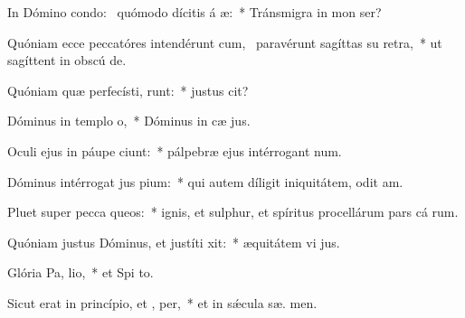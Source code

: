 \item In Dómino condo:~\pscross{} quómodo dícitis á æ:~* Tránsmigra in mon  ser?
\item Quóniam ecce peccatóres intendérunt cum,~\pscross{} paravérunt sagíttas su  retra,~* ut sagíttent in obscú  de.
\item Quóniam quæ perfecísti, runt:~* justus   cit?
\item Dóminus in templo  o,~* Dóminus in cæ  jus.
\item Oculi ejus in páupe ciunt:~* pálpebræ ejus intérrogant  num.
\item Dóminus intérrogat jus  pium:~* qui autem díligit iniquitátem, odit  am.
\item Pluet super pecca queos:~* ignis, et sulphur, et spíritus procellárum pars cá rum.
\item Quóniam justus Dóminus, et justíti xit:~* æquitátem vi  jus.
\item Glória Pa,  lio,~* et Spi to.
\item Sicut erat in princípio, et ,  per,~* et in sǽcula sæ. men.
